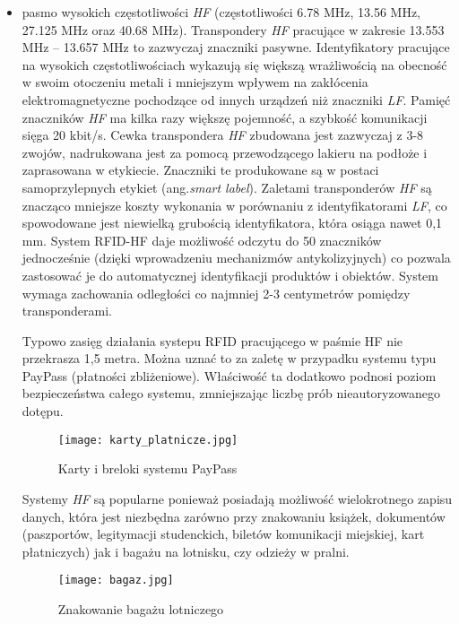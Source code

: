 \begin{itemize}
	\newpage


	\item pasmo wysokich częstotliwości \emph{HF} (częstotliwości 6.78 MHz, 13.56 MHz, 27.125 MHz oraz 40.68 MHz). 
Transpondery \emph{HF} pracujące w zakresie 13.553 MHz – 13.657 MHz to zazwyczaj znaczniki pasywne. Identyfikatory pracujące na wysokich częstotliwościach wykazują się większą wrażliwością na obecność w swoim otoczeniu metali i mniejszym wpływem na zakłócenia elektromagnetyczne pochodzące od innych urządzeń niż znaczniki \emph{LF}. Pamięć znaczników \emph{HF} ma kilka razy większę pojemność, a szybkość komunikacji sięga 20 kbit/s. Cewka transpondera \emph{HF} zbudowana jest zazwyczaj z 3-8 zwojów, nadrukowana jest za pomocą przewodzącego lakieru na podłoże i zaprasowana w etykiecie. Znaczniki te produkowane są w postaci samoprzylepnych etykiet (ang.\emph{smart label}). Zaletami transponderów \emph{HF} są znacząco mniejsze koszty wykonania w porównaniu z identyfikatorami \emph{LF}, co spowodowane jest niewielką grubością identyfikatora, która osiąga nawet 0,1 mm. System RFID-HF daje możliwość odczytu do 50 znaczników jednocześnie (dzięki wprowadzeniu mechanizmów antykolizyjnych) co pozwala zastosować je do automatycznej identyfikacji produktów i obiektów. System wymaga zachowania odległości co najmniej 2-3 centymetrów pomiędzy transponderami. 
	
	Typowo zasięg działania systepu RFID pracującego w paśmie HF nie przekrasza 1,5 metra. Można uznać to za zaletę w przypadku systemu typu PayPass (płatności zbliżeniowe). Właściwość ta dodatkowo podnosi poziom bezpieczeństwa całego systemu, zmniejszając liczbę prób nieautoryzowanego dotępu.  

	\begin{figure}[h!]
	\centering
	    \texttt{[image: karty\_platnicze.jpg]}
	    \caption{Karty i breloki systemu PayPass}
	\end{figure}

	Systemy \emph{HF} są popularne ponieważ posiadają możliwość wielokrotnego zapisu danych, która jest niezbędna zarówno przy znakowaniu książek, dokumentów (paszportów, legitymacji studenckich, biletów komunikacji miejskiej, kart płatniczych) jak i bagażu na lotnisku, czy odzieży w pralni.

	\begin{figure}[h!]
	\centering
	    \texttt{[image: bagaz.jpg]}
	    \caption{Znakowanie bagażu lotniczego}
	\end{figure}


\end{itemize}
